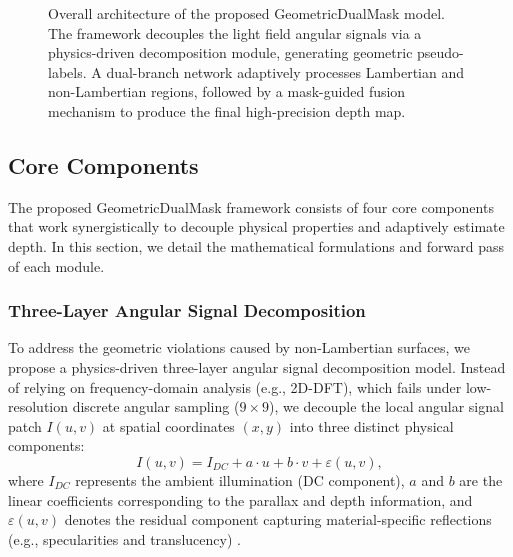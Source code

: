 \documentclass[lettersize,journal]{IEEEtran}
\begin{document}
\begin{figure}[!t]
\caption{Overall architecture of the proposed GeometricDualMask model. The framework decouples the light field angular signals via a physics-driven decomposition module, generating geometric pseudo-labels. A dual-branch network adaptively processes Lambertian and non-Lambertian regions, followed by a mask-guided fusion mechanism to produce the final high-precision depth map.}
\label{fig:architecture}
\end{figure}

\subsection{Core Components}

The proposed GeometricDualMask framework consists of four core components that work synergistically to decouple physical properties and adaptively estimate depth. In this section, we detail the mathematical formulations and forward pass of each module.

\subsubsection{Three-Layer Angular Signal Decomposition}
To address the geometric violations caused by non-Lambertian surfaces, we propose a physics-driven three-layer angular signal decomposition model. Instead of relying on frequency-domain analysis (e.g., 2D-DFT), which fails under low-resolution discrete angular sampling ($9 \times 9$), we decouple the local angular signal patch $I(u,v)$ at spatial coordinates $(x,y)$ into three distinct physical components:
\begin{equation}
    I(u,v) = I_{DC} + a \cdot u + b \cdot v + \varepsilon(u,v),
    \label{eq:ch3_1}
\end{equation}
where $I_{DC}$ represents the ambient illumination (DC component), $a$ and $b$ are the linear coefficients corresponding to the parallax and depth information, and $\varepsilon(u,v)$ denotes the residual component capturing material-specific reflections (e.g., specularities and translucency) \cite{smith2023lightfield}. 
\end{document}
